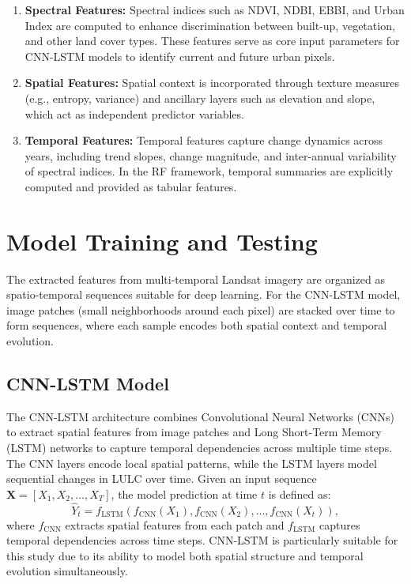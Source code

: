 \documentclass[main]{subfiles}
\begin{document}
\begin{enumerate}[label=(\roman*)]
    \item \textbf{Spectral Features:}  
    Spectral indices such as NDVI, NDBI, EBBI, and Urban Index are computed to enhance discrimination between built-up, vegetation, and other land cover types. These features serve as core input parameters for CNN-LSTM models to identify current and future urban pixels.

    \item \textbf{Spatial Features:}  
    Spatial context is incorporated through texture measures (e.g., entropy, variance) and ancillary layers such as elevation and slope, which act as independent predictor variables.

    \item \textbf{Temporal Features:}  
    Temporal features capture change dynamics across years, including trend slopes, change magnitude, and inter-annual variability of spectral indices. In the RF framework, temporal summaries are explicitly computed and provided as tabular features.
\end{enumerate}


\section{Model Training and Testing}
The extracted features from multi-temporal Landsat imagery are organized as spatio-temporal sequences suitable for deep learning. For the CNN-LSTM model, image patches (small neighborhoods around each pixel) are stacked over time to form sequences, where each sample encodes both spatial context and temporal evolution.

\subsection*{CNN-LSTM Model}
The CNN-LSTM architecture combines Convolutional Neural Networks (CNNs) to extract spatial features from image patches and Long Short-Term Memory (LSTM) networks to capture temporal dependencies across multiple time steps. The CNN layers encode local spatial patterns, while the LSTM layers model sequential changes in LULC over time. Given an input sequence $\mathbf{X} = [X_1, X_2, \dots, X_T]$, the model prediction at time $t$ is defined as:
\begin{equation}
\hat{Y}_t = f_{\text{LSTM}}(f_{\text{CNN}}(X_1), f_{\text{CNN}}(X_2), \dots, f_{\text{CNN}}(X_t)),
\end{equation}
where $f_{\text{CNN}}$ extracts spatial features from each patch and $f_{\text{LSTM}}$ captures temporal dependencies across time steps. CNN-LSTM is particularly suitable for this study due to its ability to model both spatial structure and temporal evolution simultaneously.
\end{document}
